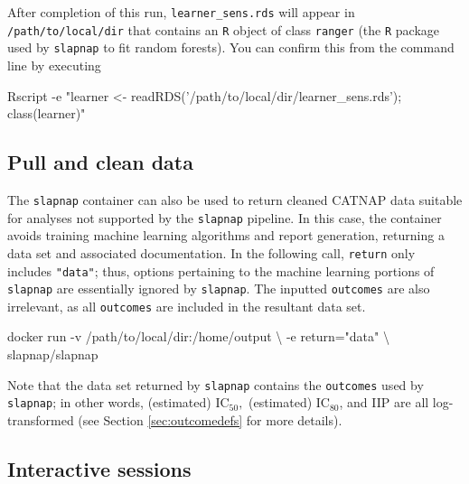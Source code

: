 \documentclass[]{article}
\newenvironment{Shaded}{\begin{snugshade}}{\end{snugshade}}
\newcommand{\StringTok}[1]{\textcolor[rgb]{0.31,0.60,0.02}{#1}}
\newcommand{\ExtensionTok}[1]{#1}
\newcommand{\NormalTok}[1]{#1}
\begin{document}
After completion of this run, \texttt{learner\_sens.rds} will appear in
\texttt{/path/to/local/dir} that contains an \texttt{R} object of class
\texttt{ranger} (the \texttt{R} package used by \texttt{slapnap} to fit
random forests). You can confirm this from the command line by executing

\begin{Shaded}
\begin{Highlighting}[]
\ExtensionTok{Rscript}\NormalTok{ -e }\StringTok{"learner <- readRDS('/path/to/local/dir/learner_sens.rds'); class(learner)"}
\end{Highlighting}
\end{Shaded}

\subsection{Pull and clean data}\label{pull-and-clean-data}

The \texttt{slapnap} container can also be used to return cleaned CATNAP
data suitable for analyses not supported by the \texttt{slapnap}
pipeline. In this case, the container avoids training machine learning
algorithms and report generation, returning a data set and associated
documentation. In the following call, \texttt{return} only includes
\texttt{"data"}; thus, options pertaining to the machine learning
portions of \texttt{slapnap} are essentially ignored by
\texttt{slapnap}. The inputted \texttt{outcomes} are also irrelevant, as
all \texttt{outcomes} are included in the resultant data set.

\begin{Shaded}
\begin{Highlighting}[]
\ExtensionTok{docker}\NormalTok{ run -v /path/to/local/dir:/home/output \textbackslash{}}
\NormalTok{           -e return=}\StringTok{"data"}\NormalTok{ \textbackslash{}}
\NormalTok{           slapnap/slapnap}
\end{Highlighting}
\end{Shaded}

Note that the data set returned by \texttt{slapnap} contains the
\texttt{outcomes} used by \texttt{slapnap}; in other words, (estimated)
IC\(_{50},\) (estimated) IC\(_{80}\), and IIP are all log-transformed
(see Section \ref{sec:outcomedefs} for more details).

\subsection{Interactive sessions}\label{interactive-sessions}
\end{document}
